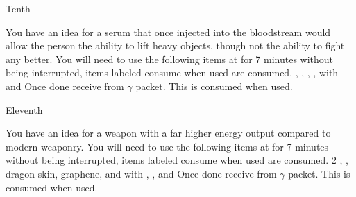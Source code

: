 \documentclass[greennotebook]{guildcamp3} %
\begin{document}
\begin{page}{Tenth}
	
	You have an idea for a serum that once injected into the bloodstream would allow the person the ability to lift heavy objects, though not the ability to fight any better.
	You will need to use the following items at \sSciWorkbench{} for 7 minutes without being interrupted, items labeled consume when used are consumed.
	\iCompoundNine{}, \iBloodPlasma{}, \iWerewolfFang{}, \iZirconia{}, \iGraphiteLube{} with \iMagnet{} and \iCentrifuge{}
	Once done receive \iSteroids{} from $\gamma$ packet. This is consumed when used. 
	
\end{page}

\begin{page}{Eleventh}
	
	You have an idea for a weapon with a far higher energy output compared to modern weaponry.
	You will need to use the following items at \sSciWorkbench{} for 7 minutes without being interrupted, items labeled consume when used are consumed.
	2 \iScrapMetal{}, \iNiobiumCarbide{}, dragon skin, graphene, and \iGraphiteLube{} with \iDiamondDrill{}, \iMultitool{}, and \iMonoBlade{}
	Once done receive \iUpgradedTechGun{} from $\gamma$ packet. This is consumed when used. 
	
\end{page}




\endnotebook
\end{document}
